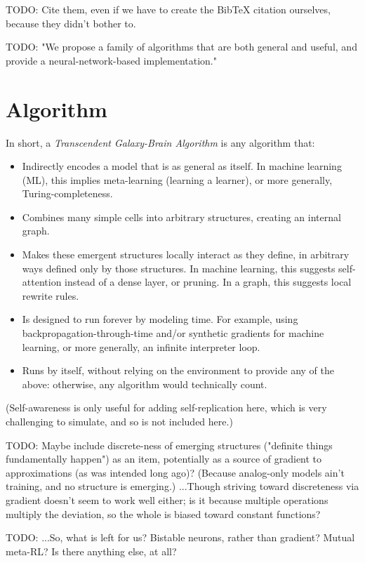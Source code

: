 \documentclass{article}
\begin{document}
    TODO: Cite them, even if we have to create the BibTeX citation ourselves, because they didn't bother to.

    TODO: "We propose a family of algorithms that are both general and useful, and provide a neural-network-based implementation."

\section{Algorithm}

In short, a \textit{Transcendent Galaxy-Brain Algorithm} is any algorithm that:

\begin{itemize}
\item Indirectly encodes a model that is as general as itself. In machine learning (ML), this implies meta-learning (learning a learner), or more generally, Turing-completeness.
\item Combines many simple cells into arbitrary structures, creating an internal graph.
\item Makes these emergent structures locally interact as they define, in arbitrary ways defined only by those structures. In machine learning, this suggests self-attention instead of a dense layer, or pruning. In a graph, this suggests local rewrite rules.
\item Is designed to run forever by modeling time. For example, using backpropagation-through-time and/or synthetic gradients for machine learning, or more generally, an infinite interpreter loop.
\item Runs by itself, without relying on the environment to provide any of the above: otherwise, any algorithm would technically count.
\end{itemize}

(Self-awareness is only useful for adding self-replication here, which is very challenging to simulate, and so is not included here.)

    TODO: Maybe include discrete-ness of emerging structures ("definite things fundamentally happen") as an item, potentially as a source of gradient to approximations (as was intended long ago)? (Because analog-only models ain't training, and no structure is emerging.) ...Though striving toward discreteness via gradient doesn't seem to work well either; is it because multiple operations multiply the deviation, so the whole is biased toward constant functions?

    TODO: ...So, what is left for us? Bistable neurons, rather than gradient? Mutual meta-RL? Is there anything else, at all?
\end{document}
